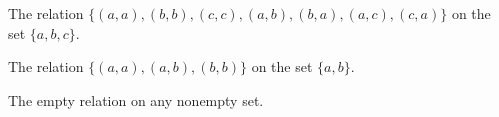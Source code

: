 \subexercise
The relation $\{(a,a),(b,b),(c,c),(a,b),(b,a),(a,c),(c,a)\}$ on the set $\{a,b,c\}$.

\subexercise
The relation $\{(a,a),(a,b),(b,b)\}$ on the set $\{a,b\}$.

\subexercise
The empty relation on any nonempty set.

